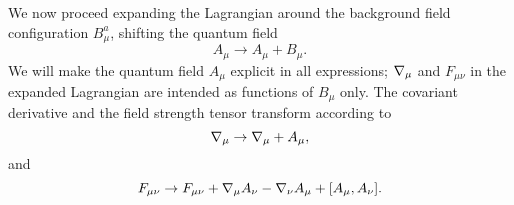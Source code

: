 We now proceed expanding the Lagrangian around the background field configuration $B_\mu^a$, shifting the quantum field
\begin{equation}\label{ym-shift-field}
A_\mu \rightarrow A_\mu + B_\mu.
\end{equation}
We will make the quantum field $A_\mu$ explicit in all expressions; ${ \mathcal{\nabla} }_\mu$ and $F_{\mu\nu}$ in the expanded Lagrangian are intended as functions of $B_\mu$ only.
The covariant derivative and the field strength tensor transform according to
\begin{equation}\label{ym-shift-covD}
{ \mathcal{\nabla} }_\mu  \rightarrow { \mathcal{\nabla} }_\mu + A_\mu,	 	
\end{equation}
and
\begin{equation}\label{ym-shift-Fmunu}
F_{ \mu \nu}  \rightarrow F_{\mu\nu} +  { \mathcal{\nabla} }_\mu A_\nu - { \mathcal{\nabla} }_\nu A_\mu + [A_\mu,A_\nu].
\end{equation}

